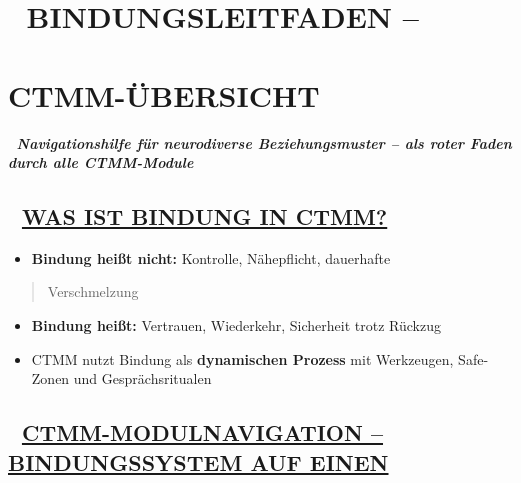 %


\hypertarget{bindungsleitfaden}{%
\section{\texorpdfstring{\textbf{🏥 BINDUNGSLEITFADEN --}}{🏥 BINDUNGSLEITFADEN --}}\label{bindungsleitfaden}}

\hypertarget{ctmm-uxfcbersicht}{%
\section{\texorpdfstring{\textbf{CTMM-ÜBERSICHT}}{CTMM-ÜBERSICHT}}\label{ctmm-uxfcbersicht}}

🧩 \emph{\textbf{Navigationshilfe für neurodiverse Beziehungsmuster -- als roter Faden durch alle CTMM-Module}}

\hypertarget{was-ist-bindung-in-ctmm}{%
\subsection{\texorpdfstring{\textbf{📘 \ul{WAS IST BINDUNG IN CTMM?}}}{📘 WAS IST BINDUNG IN CTMM?}}\label{was-ist-bindung-in-ctmm}}

\begin{itemize}
\tightlist
\item
  \textbf{Bindung heißt nicht:} Kontrolle, Nähepflicht, dauerhafte
\end{itemize}

\begin{quote}
Verschmelzung
\end{quote}

\begin{itemize}
\tightlist
\item
  \textbf{Bindung heißt:} Vertrauen, Wiederkehr, Sicherheit trotz Rückzug
\item
  CTMM nutzt Bindung als \textbf{dynamischen Prozess} mit Werkzeugen, Safe-Zonen und Gesprächsritualen
\end{itemize}

\hypertarget{ctmm-modulnavigation-bindungssystem-auf-einen}{%
\subsection{\texorpdfstring{\textbf{🧭 \ul{CTMM-MODULNAVIGATION -- BINDUNGSSYSTEM AUF EINEN}}}{🧭 CTMM-MODULNAVIGATION -- BINDUNGSSYSTEM AUF EINEN}}\label{ctmm-modulnavigation-bindungssystem-auf-einen}}

